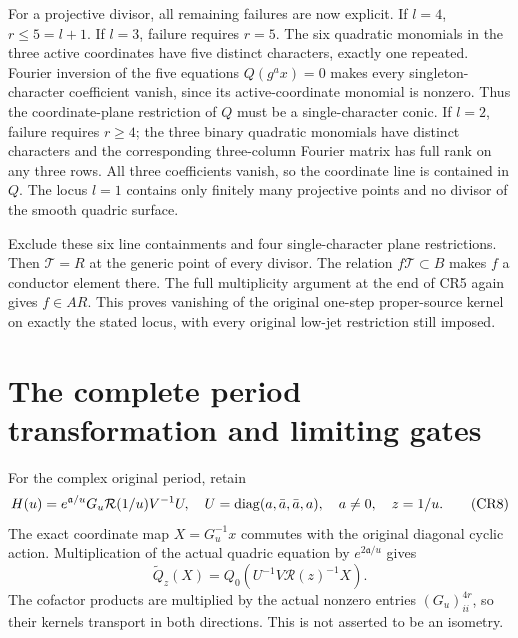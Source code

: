 \documentclass[11pt]{article}
\begin{document}
For a projective divisor, all remaining failures are now explicit.
If $l=4$, $r\le5=l+1$.  If $l=3$, failure requires $r=5$.
The six quadratic monomials in the three active coordinates
have five distinct characters, exactly one repeated.  Fourier
inversion of the five equations $Q(g^a x)=0$ makes every
singleton-character coefficient vanish, since its active-coordinate
monomial is nonzero.  Thus the coordinate-plane restriction of
$Q$ must be a single-character conic.  If $l=2$, failure requires
$r\ge4$; the three binary quadratic monomials have distinct
characters and the corresponding three-column Fourier matrix
has full rank on any three rows.  All three coefficients vanish,
so the coordinate line is contained in $Q$.  The locus $l=1$
contains only finitely many projective points and no divisor of
the smooth quadric surface.

Exclude these six line containments and four single-character
plane restrictions.  Then $\mathcal T=R$ at the generic point
of every divisor.  The relation $f\mathcal T\subset B$ makes
$f$ a conductor element there.  The full multiplicity argument
at the end of CR5 again gives $f\in AR$.  This proves vanishing
of the original one-step proper-source kernel on exactly the
stated locus, with every original low-jet restriction still imposed.

\section{The complete period transformation and limiting gates}
For the complex original period, retain
\[
 H(u)=e^{\mathfrak a/u}G_u\mathcal R(1/u)V^{-1}U,
 \quad U=\operatorname{diag}(a,\bar a,\bar a,a),\quad a\ne0,\quad z=1/u.
                                                                    \tag{CR8}
\]
The exact coordinate map $X=G_u^{-1}x$ commutes with the original
diagonal cyclic action.  Multiplication of the actual quadric
equation by $e^{2\mathfrak a/u}$ gives
\[
 \widetilde Q_z(X)=Q_0(U^{-1}V\mathcal R(z)^{-1}X).              \tag{CR9}
\]
The cofactor products are multiplied by the actual nonzero
entries $(G_u)_{ii}^{4r}$, so their kernels transport in both
directions.  This is not asserted to be an isometry.
\end{document}
